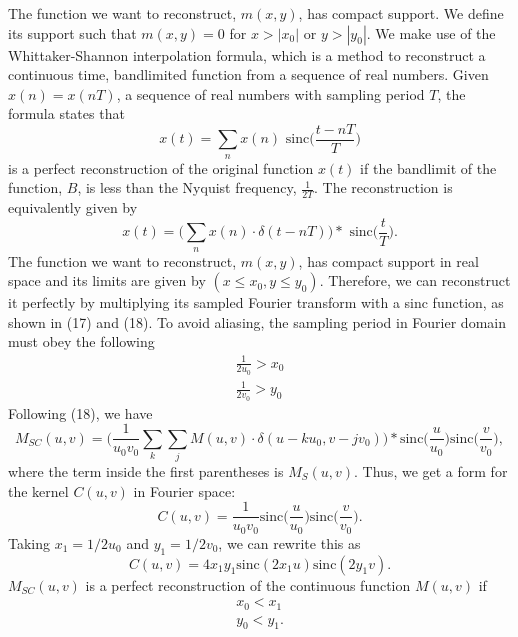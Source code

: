 \documentclass[11pt]{article}
\begin{document}
The function we want to reconstruct, $m(x,y)$, has compact support. We define its support such that $m(x,y) = 0$ for $x>|x_0|$ or $y>|y_0|$. We make use of the Whittaker-Shannon interpolation formula, which is a method to reconstruct a continuous time, bandlimited function from a sequence of real numbers. Given $x(n) = x(nT)$, a sequence of real numbers with sampling period $T$, the formula states that 
\begin{equation}
x(t) = \sum_n x(n) \text{ sinc}\Bigg( \frac{t-nT}{T}\Bigg)
\end{equation}
is a perfect reconstruction of the original function $x(t)$ if the bandlimit of the function, $B$, is less than the Nyquist frequency, $\frac{1}{2T}$. The reconstruction is equivalently given by 
\begin{equation}
x(t) = \Bigg(\sum_n x(n) \cdot \delta(t-nT)\Bigg) \ast \text{ sinc}\Bigg( \frac{t}{T}\Bigg).
\end{equation}
The function we want to reconstruct, $m(x,y)$, has compact support in real space and its limits are given by $(x \leq x_0, y \leq y_0)$. Therefore, we can reconstruct it perfectly by multiplying its sampled Fourier transform with a sinc function, as shown in (17) and (18). To avoid aliasing, the sampling period in Fourier domain must obey the following
\begin{align}
\frac{1}{2u_0} > x_0 \\
\frac{1}{2v_0} > y_0
\end{align}
Following (18), we have
\begin{equation}
M_{SC}(u,v) =\Bigg( \frac{1}{u_0v_0} \sum_k \sum_j M(u,v) \cdot \delta(u-ku_0, v-jv_0)\Bigg) \ast \text{sinc}\Bigg(\frac{u}{u_0}\Bigg)\text{sinc}\Bigg(\frac{v}{v_0}\Bigg),
\end{equation}
where the term inside the first parentheses is $M_{S}(u,v)$. Thus, we get a form for the kernel $C(u,v)$ in Fourier space:
\begin{equation}
C(u,v) = \frac{1}{u_0v_0}\text{sinc}\Bigg(\frac{u}{u_0}\Bigg)\text{sinc}\Bigg(\frac{v}{v_0}\Bigg).
\end{equation}
Taking $x_1 = 1/2u_0$ and $y_1 = 1/2v_0$, we can rewrite this as
\begin{equation}
C(u,v) = 4x_1 y_1 \text{sinc}(2x_1 u) \text{sinc}(2y_1 v).
\end{equation}
$M_{SC}(u,v)$ is a perfect reconstruction of the continuous function $M(u,v)$ if
\begin{align}
x_0 < x_1 \\
y_0 < y_1.
\end{align}
\end{document}
